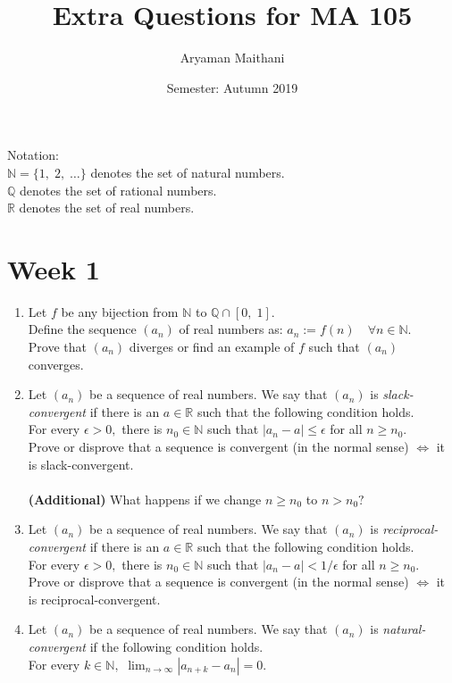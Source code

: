 \documentclass{article}
\title{Extra Questions for MA 105}
\author{Aryaman Maithani}
\date{Semester: Autumn 2019}
\begin{document}
\maketitle
\hrulefill

Notation:\\
$\mathbb{N} = \{1,\; 2,\; \ldots\}$ denotes the set of natural numbers.\\
$\mathbb{Q}$ denotes the set of rational numbers.\\
$\mathbb{R}$ denotes the set of real numbers.
\section{Week 1}
\begin{enumerate}
	\item Let $f$ be any bijection from $\mathbb{N}$ to $\mathbb{Q} \cap [0,\; 1].$\\
	Define the sequence $(a_n)$ of real numbers as: $a_n := f(n) \quad \forall n \in \mathbb{N}.$\\
	Prove that $(a_n)$ diverges or find an example of $f$ such that $(a_n)$ converges.
	\item Let $(a_n)$ be a sequence of real numbers. We say that $(a_n)$ is \emph{slack-convergent} if there is an $a \in \mathbb{R}$ such that the following condition holds.\\
	For every $\epsilon > 0,$ there is $n_0 \in \mathbb{N}$ such that $|a_n - a| \le \epsilon$ for all $n \ge n_0.$\\
	Prove or disprove that a sequence is convergent (in the normal sense) $\iff$ it is slack-convergent.\\~\\
	\textbf{(Additional)} What happens if we change $n \ge n_0$ to $n > n_0?$
	\item Let $(a_n)$ be a sequence of real numbers. We say that $(a_n)$ is \emph{reciprocal-convergent} if there is an $a \in \mathbb{R}$ such that the following condition holds.\\
	For every $\epsilon > 0,$ there is $n_0 \in \mathbb{N}$ such that $|a_n - a| < 1/\epsilon$ for all $n \ge n_0.$\\
	Prove or disprove that a sequence is convergent (in the normal sense) $\iff$ it is reciprocal-convergent.
	\item Let $(a_n)$ be a sequence of real numbers. We say that $(a_n)$ is \emph{natural-convergent} if the following condition holds.\\
	For every $k \in \mathbb{N},$ $\displaystyle\lim_{n\to \infty}|a_{n+k} - a_n| = 0.$\\

\end{enumerate}
\end{document}
